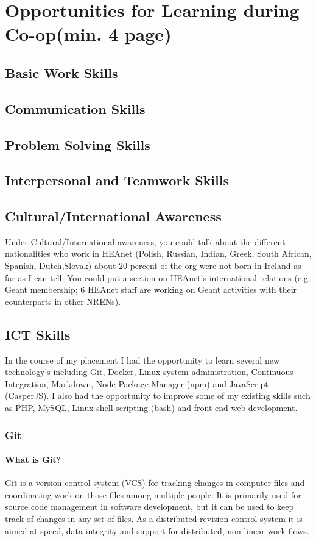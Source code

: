 \documentclass{article}
\begin{document}
	\newpage
	
	\section{Opportunities for Learning during Co-op(min. 4 page)}
	\subsection{Basic Work Skills}
	
	\subsection{Communication Skills}
	\subsection{Problem Solving Skills}
	\subsection{Interpersonal and Teamwork Skills}
	\subsection{Cultural/International Awareness}
	Under Cultural/International awareness, you could talk about the different nationalities who work in HEAnet (Polish, Russian, Indian, Greek, South African, Spanish, Dutch,Slovak) about 20 percent of the org were not born in Ireland as far as I can tell. You could put a section on HEAnet's international relations (e.g. Geant membership;  6 HEAnet staff are working on Geant activities with their counterparts in other NRENs).
	\subsection{ICT Skills}
	In the course of my placement I had the opportunity to learn several new technology's including Git, Docker, Linux system administration, Continuous Integration, Markdown, Node Package Manager (npm) and JavaScript (CasperJS).
	I also had the opportunity to improve some of my existing skills such as PHP, MySQL, Linux shell scripting (bash) and front end web development.
	\subsubsection{Git}
	\paragraph{What is Git?}
	Git is a version control system (VCS) for tracking changes in computer files and coordinating work on those files among multiple people. It is primarily used for source code management in software development, but it can be used to keep track of changes in any set of files. As a distributed revision control system it is aimed at speed, data integrity and support for distributed, non-linear work flows.
\end{document}
